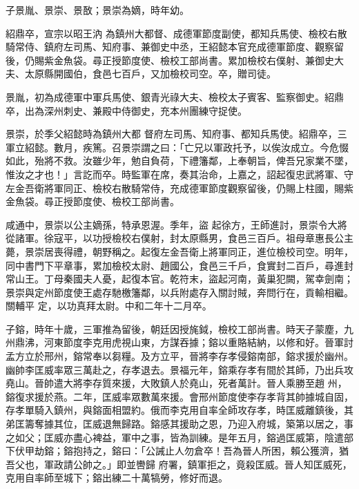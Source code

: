 \begin{pinyinscope}
 子景胤、景崇、景敔；景崇為嫡，時年幼。



 紹鼎卒，宣宗以昭王汭
 為鎮州大都督、成德軍節度副使，都知兵馬使、檢校右散騎常侍、鎮府左司馬、知府事、兼御史中丞，王紹懿本官充成德軍節度、觀察留後，仍賜紫金魚袋。尋正授節度使、檢校工部尚書。累加檢校右僕射、兼御史大夫、太原縣開國伯，食邑七百戶，又加檢校司空。卒，贈司徒。



 景胤，初為成德軍中軍兵馬使、銀青光祿大夫、檢校太子賓客、監察御史。紹鼎卒，出為深州刺史、兼殿中侍御史，充本州團練守捉使。



 景崇，於季父紹懿時為鎮州大都
 督府左司馬、知府事、都知兵馬使。紹鼎卒，三軍立紹懿。數月，疾篤。召景崇謂之曰：「亡兄以軍政托予，以俟汝成立。今危惙如此，殆將不救。汝雖少年，勉自負荷，下禮籓鄰，上奉朝旨，俾吾兄家業不墜，惟汝之才也！」言訖而卒。時監軍在席，奏其治命，上嘉之，詔起復忠武將軍、守左金吾衛將軍同正、檢校右散騎常侍，充成德軍節度觀察留後，仍賜上柱國，賜紫金魚袋。尋正授節度使、檢校工部尚書。



 咸通中，景崇以公主嫡孫，特承恩渥。季年，盜
 起徐方，王師進討，景崇令大將從諸軍。徐寇平，以功授檢校右僕射，封太原縣男，食邑三百戶。祖母章惠長公主薨，景崇居喪得禮，朝野稱之。起復左金吾衛上將軍同正，進位檢校司空。明年，同中書門下平章事，累加檢校太尉、趙國公，食邑三千戶，食實封二百戶，尋進封常山王。丁母秦國夫人憂，起復本官。乾符末，盜起河南，黃巢犯闕，駕幸劍南；景崇與定州節度使王處存馳檄籓鄰，以兵附處存入關討賊，奔問行在，貢輸相繼。關輔平
 定，以功真拜太尉。中和二年十二月卒。



 子鎔，時年十歲，三軍推為留後，朝廷因授旄鉞，檢校工部尚書。時天子蒙塵，九州鼎沸，河東節度李克用虎視山東，方謀吞據；鎔以重賂結納，以修和好。晉軍討孟方立於邢州，鎔常奉以芻糧。及方立平，晉將李存孝侵鎔南部，鎔求援於幽州。幽帥李匡威率眾三萬赴之，存孝退去。景福元年，鎔乘存孝有間於其師，乃出兵攻堯山。晉帥遣大將李存質來援，大敗鎮人於堯山，死者萬計。晉人乘勝至趙
 州，鎔復求援於燕。二年，匡威率眾數萬來援。會邢州節度使李存孝背其帥據城自固，存孝單騎入鎮州，與鎔面相盟約。俄而李克用自率全師攻存孝，時匡威離鎮後，其弟匡籌奪據其位，匡威退無歸路。鎔感其援助之恩，乃迎入府城，築第以居之，事之如父；匡威亦盡心裨益，軍中之事，皆為訓練。是年五月，鎔過匡威第，陰遣部下伏甲劫鎔；鎔抱持之，鎔曰：「公誡止人勿倉卒！吾為晉人所困，賴公獲濟，猶吾父也，軍政請公帥之。」即並轡歸
 府署，鎮軍拒之，竟殺匡威。晉人知匡威死，克用自率師至城下；鎔出練二十萬犒勞，修好而退。




\end{pinyinscope}
